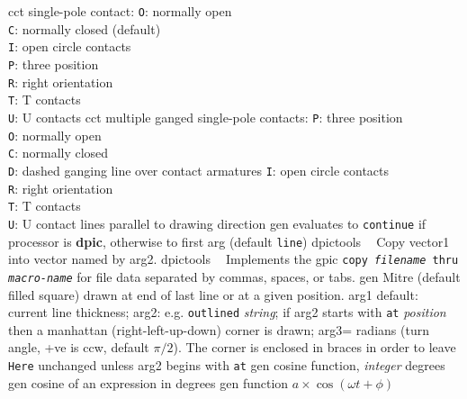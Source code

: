 %
  {cct}%
  {single-pole contact:
   {\tt O}:  normally open\\
   {\tt C}: normally closed (default)\\
   {\tt I}: open circle contacts\\
   {\tt P}: three position\\
   {\tt R}: right orientation\\
   {\tt T}: T contacts\\
   {\tt U}: U contacts
   }%
%
  {cct}%
  {multiple ganged single-pole contacts:
   {\tt P}: three position\\
   {\tt O}: normally open\\
   {\tt C}: normally closed\\
   {\tt D}: dashed ganging line over contact armatures
   {\tt I}: open circle contacts\\
   {\tt R}: right orientation\\
   {\tt T}: T contacts\\
   {\tt U}: U contact lines parallel to drawing direction
   }%
%
  {gen}%
  {evaluates to {\tt continue}
    if processor is {\bf dpic}, otherwise to first arg (default {\tt line})}%
%
  {dpictools}%
  {$\;\;$ Copy vector1 into vector named by arg2.}%
%
  {dpictools}%
  {$\;\;$ Implements the gpic {\tt copy {\sl filename} thru {\sl macro-name}}
   for file data separated by commas, spaces, or tabs.}%
%
  {gen}%
  { Mitre (default filled square) drawn at end of last line or at a
    given position.
    arg1 default: current line thickness;
    arg2: e.g. {\tt outlined} {\sl string}; if arg2 starts with
    {\tt at} {\sl position} then a manhattan (right-left-up-down) corner
    is drawn;
    arg3= radians (turn angle, +ve is ccw, default $\pi/2$).
    The corner is enclosed in braces
    in order to leave {\tt Here} unchanged unless arg2 begins with {\tt at}%
    }%
%
  {gen}%
  {cosine function, {\sl integer\/} degrees}%
%
  {gen}%
  {cosine of an expression in degrees}%
%
  {gen}%
  {function $a\times\cos(\omega t + \phi)$ }%
